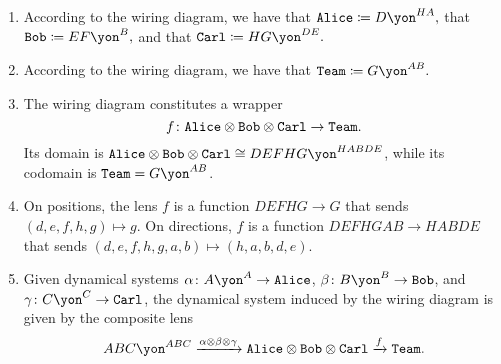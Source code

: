 \documentclass[Book-Poly]{subfiles}
\begin{document}
\begin{exercise}
\begin{solution}
\begin{enumerate}
    \item According to the wiring diagram, we have that $\const{Alice}\coloneqq D\yon^{HA},$ that $\const{Bob}\coloneqq EF\yon^B,$ and that $\const{Carl}\coloneqq HG\yon^{DE}.$
    \item According to the wiring diagram, we have that $\const{Team}\coloneqq G\yon^{AB}.$
    \item The wiring diagram constitutes a wrapper
    \[
        f\colon\texttt{Alice}\otimes\texttt{Bob}\otimes\texttt{Carl}\to\texttt{Team}.
    \]
    Its domain is $\const{Alice}\otimes\const{Bob}\otimes\const{Carl}\iso DEFHG\yon^{HABDE}$, while its codomain is $\const{Team}=G\yon^{AB}$.
    \item On positions, the lens $f$ is a function $DEFHG\to G$ that sends $(d,e,f,h,g)\mapsto g$.
    On directions, $f$ is a function $DEFHGAB\to HABDE$ that sends $(d,e,f,h,g,a,b)\mapsto(h,a,b,d,e)$.
    \item Given dynamical systems $\alpha\colon A\yon^A\to\const{Alice}$, $\beta\colon B\yon^B\to\const{Bob}$, and $\gamma\colon C\yon^C\to\const{Carl}$, the dynamical system induced by the wiring diagram is given by the composite lens
    \[
        ABC\yon^{ABC}\To{\alpha\otimes\beta\otimes\gamma}\const{Alice}\otimes\const{Bob}\otimes\const{Carl}\To{f}\const{Team}.
    \]
\end{enumerate}
\end{solution}
\end{exercise}
\end{document}
